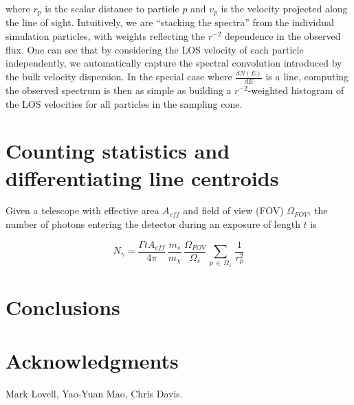 \documentclass[aps,prl,10pt,twocolumn,superscriptaddress,showpacs]{revtex4-1}
\begin{document}
where $r_p$ is the scalar distance to particle $p$ and $v_p$ is the velocity projected along the
line of sight. Intuitively, we are ``stacking the spectra'' from the individual simulation
particles, with weights reflecting the $r^{-2}$ dependence in the observed flux. One can see that by
considering the LOS velocity of each particle independently, we automatically capture the spectral
convolution introduced by the bulk velocity dispersion. In the special case where
$\frac{dN(E)}{dE}$ is a line, computing the observed spectrum is then as simple as
building a $r^{-2}$-weighted histogram of the LOS velocities for all particles in the sampling cone.


\section{Counting statistics and differentiating line centroids}

Given a telescope with effective area $A_{eff}$ and field of view (FOV) $\Omega_{FOV}$, the number
of photons entering the detector during an exposure of length $t$ is

\begin{equation} 
	N_\gamma = \frac{\Gamma t A_{eff}}{4\pi}
	\, \frac{m_s}{m_\chi} \, \frac{\Omega_{FOV}}{\Omega_s} \, \sum_{p \, \in \, \Omega_s} \, \frac{1}{r_p^{2}} 
\end{equation}






\section{Conclusions}
\label{sec:conclusions}

 
\vspace{-0.5 cm}
	

\section*{Acknowledgments} 

Mark Lovell, Yao-Yuan Mao, Chris Davis.


\newcommand{\mnras}[0]{M.N.R.A.S.}

	
\end{document}
